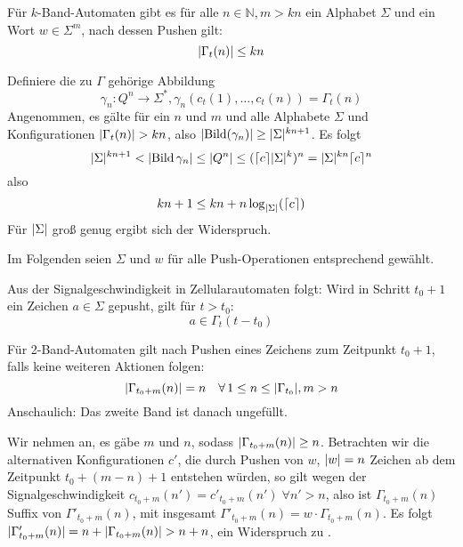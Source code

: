 \documentclass{article}
\DeclareMathOperator{\bild}{Bild}
\begin{document}
\begin{satz}
    \label{cor:spacesize}
    Für $k$-Band-Automaten gibt es für alle $n \in \mathbb{N}, m > kn$ ein Alphabet $\Sigma$ und ein Wort $w \in \Sigma^m$, nach dessen Pushen gilt:
    \[ \lvert\Gamma_t(n)\rvert \leq kn \]
    \begin{beweis}
        Definiere die zu $\Gamma$ gehörige Abbildung
        \[ \gamma_n : Q^n \rightarrow \Sigma^*, \gamma_n(c_t(1), \dots, c_t(n)) = \Gamma_t(n)\]
        Angenommen, es gälte für ein $n$ und $m$ und alle Alphabete $\Sigma$ und Konfigurationen $\lvert\Gamma_t(n)\rvert > kn$, also $\abs{\bild(\gamma_n)} \geq \abs{\Sigma}^{kn+1}$.
        Es folgt
        \[ \abs\Sigma^{kn+1} < \abs{\bild{\gamma_n}} \leq \abs{Q^n} \leq (\ceil{c}\abs{\Sigma}^k)^n = \abs{\Sigma}^{kn} \ceil{c}^n \]
        also
        \[ kn + 1 \leq kn + n \log_{\lvert\Sigma\rvert}(\lceil c\rceil) \]
        Für $\lvert\Sigma\rvert$ groß genug ergibt sich der Widerspruch.
    \end{beweis}
\end{satz}

Im Folgenden seien $\Sigma$ und $w$ für alle Push-Operationen entsprechend gewählt.

\begin{korollar}
    \label{cor:signalpush}
    Aus der Signalgeschwindigkeit in Zellularautomaten folgt: Wird in Schritt $t_0+1$ ein Zeichen $a \in \Sigma$ gepusht, gilt für $t > t_0$:
    \begin{equation}
        a \in \Gamma_t(t-t_0) \label{cor:signal}
    \end{equation}
\end{korollar}

\begin{lemma}
    \label{lem:2tape-halffilled}
    Für 2-Band-Automaten gilt nach Pushen eines Zeichens zum Zeitpunkt $t_0 + 1$, falls keine weiteren Aktionen folgen:
    \[ \lvert\Gamma_{t_0+m}(n)\rvert = n \quad\forall\, 1 \leq n \leq \lvert\Gamma_{t_0}\rvert,m > n \]
    Anschaulich: Das zweite Band ist danach ungefüllt.
    \begin{beweis}
        Wir nehmen an, es gäbe $m$ und $n$, sodass $\lvert\Gamma_{t_0+m}(n)\rvert \geq n$. Betrachten wir die alternativen Konfigurationen $c'$, die durch Pushen von $w$, $\lvert w\rvert=n$ Zeichen ab dem Zeitpunkt $t_0+(m-n)+1$ entstehen würden, so gilt wegen der Signalgeschwindigkeit $c_{t_0+m}(n') = c'_{t_0+m}(n') \;\forall n' > n$, also ist $\Gamma_{t_0+m}(n)$ Suffix von $\Gamma'_{t_0+m}(n)$, mit  insgesamt $\Gamma'_{t_0+m}(n) = w \cdot \Gamma_{t_0+m}(n)$. Es folgt $\lvert\Gamma'_{t_0+m}(n)\rvert = n + \lvert\Gamma_{t_0+m}(n)\rvert > n + n$, ein Widerspruch zu .
    \end{beweis}
\end{lemma}
\end{document}
